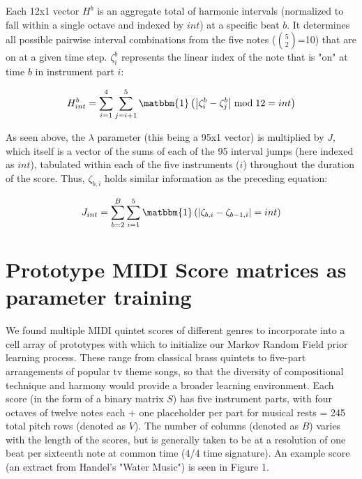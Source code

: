 \documentclass{article}
\begin{document}
Each 12x1 vector $H^b$ is an aggregate total of harmonic intervals (normalized to fall within a single octave and indexed by $int$) at a specific beat $b$.  It determines all possible pairwise interval combinations from the five notes (${5\choose2}$=10) that are on at a given time step.  $\zeta_i^b$ represents the linear index of the note that is "on" at time $b$ in instrument part $i$:

\[H_{int}^b = \sum_{i=1}^4\sum_{j=i+1}^5\matbbm{1}\left(\left|\zeta_i^b-\zeta_j^b\right|\bmod{12} = int\right)\]

As seen above, the $\lambda$ parameter (this being a 95x1 vector) is multiplied by $J$, which itself is a vector of the sums of each of the 95 interval jumps (here indexed as $int$), tabulated within each of the five instruments ($i$) throughout the duration of the score.  Thus, $\zeta_{b,i}$ holds similar information as the preceding equation:

\[J_{int} = \sum_{b=2}^{B}\sum_{i=1}^5\matbbm{1}\left(\left|\zeta_{b,i}-\zeta_{b-1,i}\right| = int\right)\]

\section{Prototype MIDI Score matrices as parameter training}

We found multiple MIDI quintet scores of different genres to incorporate into a cell array of prototypes with which to initialize our Markov Random Field prior learning process.  These range from classical brass quintets to five-part arrangements of popular tv theme songs, so that the diversity of compositional technique and harmony would provide a broader learning environment.  Each score (in the form of a binary matrix $S$) has five instrument parts, with four octaves of twelve notes each + one placeholder per part for musical rests = 245 total pitch rows (denoted as $V$).  The number of columns (denoted as $B$) varies with the length of the scores, but is generally taken to be at a resolution of one beat per sixteenth note at common time (4/4 time signature).  An example score (an extract from Handel's "Water Music") is seen in Figure 1.
\end{document}
